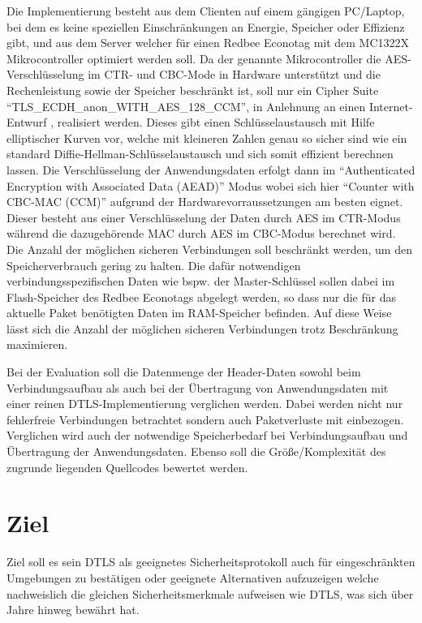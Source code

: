 \documentclass[a4paper,10pt]{report}
\begin{document}
Die Implementierung besteht aus dem Clienten auf einem gängigen PC/Laptop, bei dem es keine speziellen Einschränkungen an Energie,
Speicher oder Effizienz gibt, und aus dem Server welcher für einen Redbee Econotag \cite{econotag} mit dem MC1322X
Mikrocontroller \cite{mc1322x} optimiert werden soll. Da der genannte Mikrocontroller die AES-Verschlüsselung im CTR- und CBC-Mode
in Hardware unterstützt und die Rechenleistung sowie der Speicher beschränkt ist, soll nur ein Cipher Suite "`TLS\_ECDH\_anon\_WITH\_AES\_128\_CCM"',
in Anlehnung an einen Internet-Entwurf \cite{draftaesecc}, realisiert werden. Dieses gibt einen Schlüsselaustausch mit Hilfe elliptischer
Kurven vor, welche mit kleineren Zahlen genau so sicher sind wie ein standard Diffie-Hellman-Schlüsselaustausch und sich somit effizient berechnen
lassen. Die Verschlüsselung der Anwendungsdaten erfolgt dann im "`Authenticated Encryption with Associated Data (AEAD)"' Modus \cite{rfc5116}
wobei sich hier "`Counter with CBC-MAC (CCM)"' \cite{rfc3610} aufgrund der Hardwarevorraussetzungen am besten eignet. Dieser besteht
aus einer Verschlüsselung der Daten durch AES im CTR-Modus während die dazugehörende MAC durch AES im CBC-Modus berechnet wird.
Die Anzahl der möglichen sicheren Verbindungen soll beschränkt werden, um den Speicherverbrauch gering zu halten.
Die dafür notwendigen verbindungsspezifischen Daten wie bspw. der Master-Schlüssel sollen dabei im Flash-Speicher des Redbee Econotags
abgelegt werden, so dass nur die für das aktuelle Paket benötigten Daten im RAM-Speicher befinden. Auf diese Weise lässt sich
die Anzahl der möglichen sicheren Verbindungen trotz Beschränkung maximieren.

Bei der Evaluation soll die Datenmenge der Header-Daten sowohl beim Verbindungsaufbau als auch bei der Übertragung von Anwendungsdaten
mit einer reinen DTLS-Implementierung verglichen werden. Dabei werden nicht nur fehlerfreie Verbindungen betrachtet sondern auch Paketverluste
mit einbezogen. Verglichen wird auch der notwendige Speicherbedarf bei Verbindungsaufbau und Übertragung der Anwendungsdaten.
Ebenso soll die Größe/Komplexität des zugrunde liegenden Quellcodes bewertet werden.

\section{Ziel}
Ziel soll es sein DTLS als geeignetes Sicherheitsprotokoll auch für eingeschränkten Umgebungen zu bestätigen oder geeignete Alternativen
aufzuzeigen welche nachweislich die gleichen Sicherheitsmerkmale aufweisen wie DTLS, was sich über Jahre hinweg bewährt hat.
\end{document}
